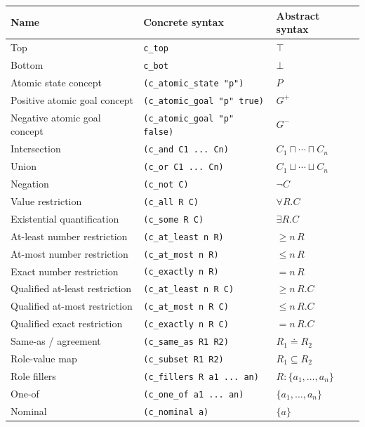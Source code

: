 \documentclass[11pt]{article}
\newenvironment{compacttable}
  {\begingroup\setlength{\tabcolsep}{3pt}}
  {\endgroup}
\begin{document}
\begin{compacttable}
\begin{longtable}{>{\raggedright\arraybackslash}p{}
                  >{\raggedright\arraybackslash}p{}
                  >{\raggedright\arraybackslash}p{}}
\toprule
Name & Concrete syntax & Abstract syntax \\
\midrule
\endhead
Top & \texttt{c\_top} & $\top$ \\
Bottom & \texttt{c\_bot} & $\bot$ \\
Atomic state concept & \texttt{(c\_atomic\_state "p")} & $P$ \\
Positive atomic goal concept & \texttt{(c\_atomic\_goal "p" true)} & $G^+$ \\
Negative atomic goal concept & \texttt{(c\_atomic\_goal "p" false)} & $G^-$ \\
Intersection & \texttt{(c\_and C1 ... Cn)} & $C_1 \sqcap \cdots \sqcap C_n$ \\
Union & \texttt{(c\_or C1 ... Cn)} & $C_1 \sqcup \cdots \sqcup C_n$ \\
Negation & \texttt{(c\_not C)} & $\neg C$ \\
Value restriction & \texttt{(c\_all R C)} & $\forall R.C$ \\
Existential quantification & \texttt{(c\_some R C)} & $\exists R.C$ \\
At-least number restriction & \texttt{(c\_at\_least n R)} & $\geq n\,R$ \\
At-most number restriction & \texttt{(c\_at\_most n R)} & $\leq n\,R$ \\
Exact number restriction & \texttt{(c\_exactly n R)} & $= n\,R$ \\
Qualified at-least restriction & \texttt{(c\_at\_least n R C)} & $\geq n\,R.C$ \\
Qualified at-most restriction & \texttt{(c\_at\_most n R C)} & $\leq n\,R.C$ \\
Qualified exact restriction & \texttt{(c\_exactly n R C)} & $= n\,R.C$ \\
Same-as / agreement & \texttt{(c\_same\_as R1 R2)} & $R_1 \doteq R_2$ \\
Role-value map & \texttt{(c\_subset R1 R2)} & $R_1 \subseteq R_2$ \\
Role fillers & \texttt{(c\_fillers R a1 ... an)} & $R:\{a_1,\ldots,a_n\}$ \\
One-of & \texttt{(c\_one\_of a1 ... an)} & $\{a_1,\ldots,a_n\}$ \\
Nominal & \texttt{(c\_nominal a)} & $\{a\}$ \\
\bottomrule
\end{longtable}
\end{compacttable}
\end{document}

